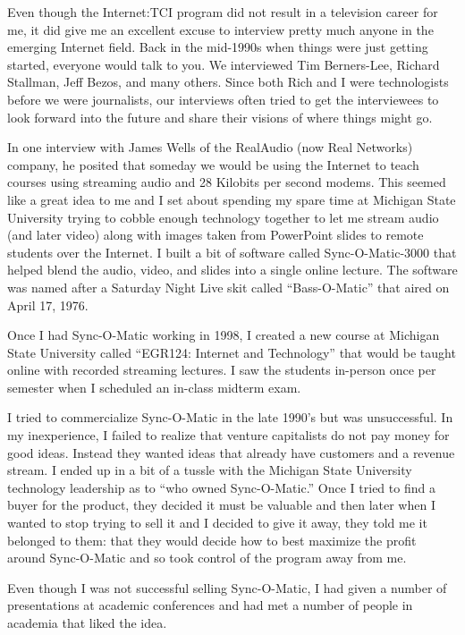 \documentclass[12pt]{book}
\begin{document}
Even though the Internet:TCI program did not result in a television
career for me, it did give me an excellent excuse to interview
pretty much anyone in the emerging Internet field.   Back in the mid-1990s
when things were just getting started, everyone would talk to you.
We interviewed Tim Berners-Lee, Richard Stallman, Jeff Bezos, and many
others.  Since both Rich and I were technologists before we were
journalists, our interviews often tried to get the interviewees to look
forward into the future and share their visions of where things might go.

In one interview with James Wells of the RealAudio (now Real Networks)
company, he posited that someday we would be using the Internet to
teach courses using streaming audio and 28 Kilobits per second modems.
This seemed like a great idea to me and I set about spending my spare
time at Michigan State University trying to cobble enough technology
together to let me stream audio (and later video) along with images taken
from PowerPoint slides to remote students over the Internet.  I built
a bit of software called Sync-O-Matic-3000 that helped
blend the audio, video, and slides into a single online lecture.
The software was named after a Saturday Night Live skit called
``Bass-O-Matic'' that aired on April 17, 1976.

Once I had Sync-O-Matic working in 1998, I created a new course at
Michigan State University called ``EGR124: Internet and Technology''
that would be taught online with recorded streaming lectures.
I saw the students in-person once per semester when I scheduled
an in-class midterm exam.

I tried to commercialize Sync-O-Matic in the late 1990's but was
unsuccessful.  In my inexperience, I failed to realize that venture
capitalists do not pay money for good ideas.  Instead they wanted
ideas that already have customers and a revenue stream.  I ended
up in a bit of a tussle with the Michigan State University technology
leadership as to ``who owned Sync-O-Matic.''  Once I tried to find
a buyer for the product, they decided it must be valuable and then later
when I wanted to stop trying to sell it and I decided to give it away, they told
me it belonged to them:  that they would decide how to best maximize
the profit around Sync-O-Matic and so took control of the program away
from me.

Even though I was not successful selling Sync-O-Matic, I had
given a number of presentations at academic conferences and
had met a number of people in academia that liked the idea.
\end{document}
